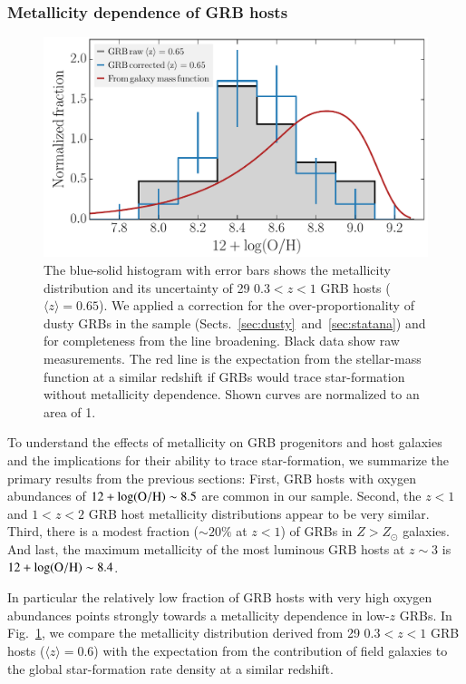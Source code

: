 \documentclass[traditabstract, longauth]{aa}
\newcommand{\oh}{12+\log(\rm{O/H})}
\begin{document}
\subsubsection{Metallicity dependence of GRB hosts}

\begin{figure}
\includegraphics[angle=0, width=0.99\columnwidth]{Figs/MetvsMass.pdf}
\caption{ {The blue-solid histogram with error bars shows the metallicity distribution and its uncertainty of 29 $0.3<z<1$ GRB hosts ($\langle z \rangle = 0.65$). We applied a correction for the over-proportionality of dusty GRBs in the sample (Sects.~\ref{sec:dusty}~and~\ref{sec:statana}) and for completeness from the line broadening. Black data show raw measurements. The red line is the expectation from the stellar-mass function at a similar redshift \citep{2013A&A...556A..55I, 2014ApJ...783...85T} if GRBs would trace star-formation without metallicity dependence. Shown curves are normalized to an area of 1.}}
\label{fig:metvsmass}
\end{figure}

To understand the effects of metallicity on GRB progenitors and host galaxies and the implications for their ability to trace star-formation, we summarize the primary results from the previous sections: First, GRB hosts with oxygen abundances of $\oh\sim8.5$ are common in our sample. Second, the $z<1$ and $1<z<2$ GRB host metallicity distributions appear to be very similar. Third, there is a modest fraction ($\sim 20\%$ at $z<1$) of GRBs in $Z > Z_{\odot}$ galaxies. And last, the maximum metallicity of the most luminous GRB hosts at $z\sim3$ is $\oh\sim8.4$.

{In particular the relatively low fraction of GRB hosts with very high oxygen abundances points strongly towards a metallicity dependence in low-$z$ GRBs.}  {In Fig.~\ref{fig:metvsmass}, we compare the metallicity distribution derived from 29 $0.3<z<1$ GRB hosts ($\langle z \rangle = 0.6$) with the expectation from the contribution of field galaxies to the global star-formation rate density at a similar redshift. }
\end{document}
